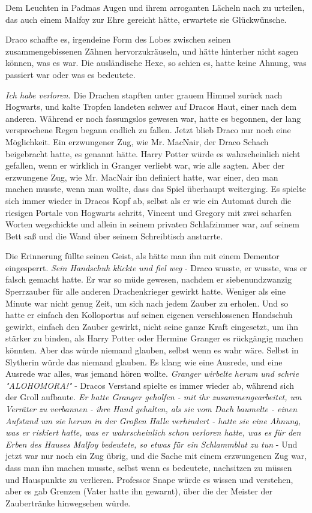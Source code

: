 {Dem Leuchten in Padmas Augen und ihrem arroganten Lächeln nach zu urteilen, das auch einem Malfoy zur Ehre gereicht hätte, erwartete sie Glückwünsche.

Draco schaffte es, irgendeine Form des Lobes zwischen seinen zusammengebissenen Zähnen hervorzukräuseln, und hätte hinterher nicht sagen können, was es war. Die ausländische Hexe, so schien es, hatte keine Ahnung, was passiert war oder was es bedeutete.

\emph{Ich habe verloren.} Die Drachen stapften unter grauem Himmel zurück nach Hogwarts, und kalte Tropfen landeten schwer auf Dracos Haut, einer nach dem anderen. Während er noch fassungslos gewesen war, hatte es begonnen, der lang versprochene Regen begann endlich zu fallen. Jetzt blieb Draco nur noch eine Möglichkeit. Ein erzwungener Zug, wie Mr. MacNair, der Draco Schach beigebracht hatte, es genannt hätte. Harry Potter würde es wahrscheinlich nicht gefallen, wenn er wirklich in Granger verliebt war, wie alle sagten. Aber der erzwungene Zug, wie Mr. MacNair ihn definiert hatte, war einer, den man machen musste, wenn man wollte, dass das Spiel überhaupt weiterging. Es spielte sich immer wieder in Dracos Kopf ab, selbst als er wie ein Automat durch die riesigen Portale von Hogwarts schritt, Vincent und Gregory mit zwei scharfen Worten wegschickte und allein in seinem privaten Schlafzimmer war, auf seinem Bett saß und die Wand über seinem Schreibtisch anstarrte.

Die Erinnerung füllte seinen Geist, als hätte man ihn mit einem Dementor eingesperrt. \emph{Sein Handschuh klickte und fiel weg} - Draco wusste, er wusste, was er falsch gemacht hatte. Er war so müde gewesen, nachdem er siebenundzwanzig Sperrzauber für alle anderen Drachenkrieger gewirkt hatte. Weniger als eine Minute war nicht genug Zeit, um sich nach jedem Zauber zu erholen. Und so hatte er einfach den Kolloportus auf seinen eigenen verschlossenen Handschuh gewirkt, einfach den Zauber gewirkt, nicht seine ganze Kraft eingesetzt, um ihn stärker zu binden, als Harry Potter oder Hermine Granger es rückgängig machen könnten. Aber das würde niemand glauben, selbst wenn es wahr wäre. Selbst in Slytherin würde das niemand glauben. Es klang wie eine Ausrede, und eine Ausrede war alles, was jemand hören wollte. \emph{Granger wirbelte herum und schrie "ALOHOMORA!"} - Dracos Verstand spielte es immer wieder ab, während sich der Groll aufbaute. \emph{Er hatte Granger geholfen - mit ihr zusammengearbeitet, um Verräter zu verbannen - ihre Hand gehalten, als sie vom Dach baumelte - einen Aufstand um sie herum in der Großen Halle verhindert - hatte sie eine Ahnung, was er riskiert hatte, was er wahrscheinlich schon verloren hatte, was es für den Erben des Hauses Malfoy bedeutete, so etwas} \emph{für ein Schlammblut zu tun} - Und jetzt war nur noch ein Zug übrig, und die Sache mit einem erzwungenen Zug war, dass man ihn machen musste, selbst wenn es bedeutete, nachsitzen zu müssen und Hauspunkte zu verlieren. Professor Snape würde es wissen und verstehen, aber es gab Grenzen (Vater hatte ihn gewarnt), über die der Meister der Zaubertränke hinwegsehen würde.

}
